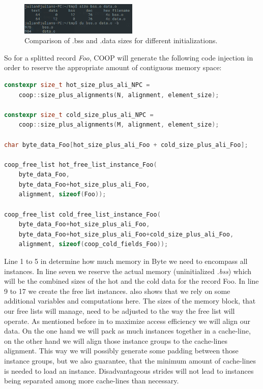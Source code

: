 \begin{figure}[!htbp]
	\centering
	\includegraphics[width=0.5\textwidth, height=0.2\textwidth]{PICs/bss_data_comparison}
	\caption{Comparison of .bss and .data sizes for different initializations.}
	\label{seg_sizes}
\end{figure}
\linebreak
So for a splitted record \textit{Foo}, COOP will generate the following code injection in order to reserve the appropriate amount of contiguous memory space:
\begin{lstlisting}[language=C++,name={Code injection to generate contiguous block of memory for a record Foo's instances.},morekeywords={constexpr, size_t, coop_free_list},label={cont_mem_foo}]
constexpr size_t hot_size_plus_ali_NPC =
	coop::size_plus_alignments(N, alignment, element_size);

constexpr size_t cold_size_plus_ali_NPC =
	coop::size_plus_alignments(M, alignment, element_size);

char byte_data_Foo[hot_size_plus_ali_Foo + cold_size_plus_ali_Foo];

coop_free_list hot_free_list_instance_Foo(
	byte_data_Foo,
	byte_data_Foo+hot_size_plus_ali_Foo,
	alignment, sizeof(Foo));

coop_free_list cold_free_list_instance_Foo(
	byte_data_Foo+hot_size_plus_ali_Foo,
	byte_data_Foo+hot_size_plus_ali_Foo+cold_size_plus_ali_Foo,
	alignment, sizeof(coop_cold_fields_Foo));
\end{lstlisting}
Line 1 to 5 in  determine how much memory in Byte we need to encompass all instances. In line seven we reserve the actual memory (uninitialized \textit{.bss}) which will be the combined sizes of the hot and the cold data for the record Foo. In line 9 to 17 we create the free list instances.  also shows that we rely on some additional variables and computations here. The sizes of the memory block, that our free lists will manage, need to be adjusted to the way the free list will operate. As mentioned before in  to maximize access efficiency we will align our data. On the one hand we will pack as much instances together in a cache-line, on the other hand we will align those instance groups to the cache-lines alignment. This way we will possibly generate some padding between those instance groups, but we also guarantee, that the minimum amount of cache-lines is needed to load an instance. Disadvantageous strides will not lead to instances being separated among more cache-lines than necessary.\\
